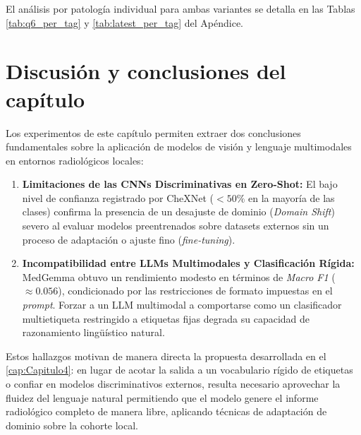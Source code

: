 \documentclass[../tesis.tex]{subfiles}
\begin{document}
El análisis por patología individual para ambas variantes se detalla en las Tablas \ref{tab:q6_per_tag} y \ref{tab:latest_per_tag} del Apéndice.

\section{Discusión y conclusiones del capítulo}
\label{sec:discusion_ch3}

Los experimentos de este capítulo permiten extraer dos conclusiones fundamentales sobre la aplicación de modelos de visión y lenguaje multimodales en entornos radiológicos locales:

\begin{enumerate}
    \item \textbf{Limitaciones de las CNNs Discriminativas en Zero-Shot:} El bajo nivel de confianza registrado por CheXNet ($<50\%$ en la mayoría de las clases) confirma la presencia de un desajuste de dominio (\textit{Domain Shift}) severo al evaluar modelos preentrenados sobre datasets externos sin un proceso de adaptación o ajuste fino (\textit{fine-tuning}).
    \item \textbf{Incompatibilidad entre LLMs Multimodales y Clasificación Rígida:} MedGemma obtuvo un rendimiento modesto en términos de \textit{Macro F1} ($\approx 0.056$), condicionado por las restricciones de formato impuestas en el \textit{prompt}. Forzar a un LLM multimodal a comportarse como un clasificador multietiqueta restringido a etiquetas fijas degrada su capacidad de razonamiento lingüístico natural.
\end{enumerate}

Estos hallazgos motivan de manera directa la propuesta desarrollada en el \autoref{cap:Capitulo4}: en lugar de acotar la salida a un vocabulario rígido de etiquetas o confiar en modelos discriminativos externos, resulta necesario aprovechar la fluidez del lenguaje natural permitiendo que el modelo genere el informe radiológico completo de manera libre, aplicando técnicas de adaptación de dominio sobre la cohorte local.
\end{document}
